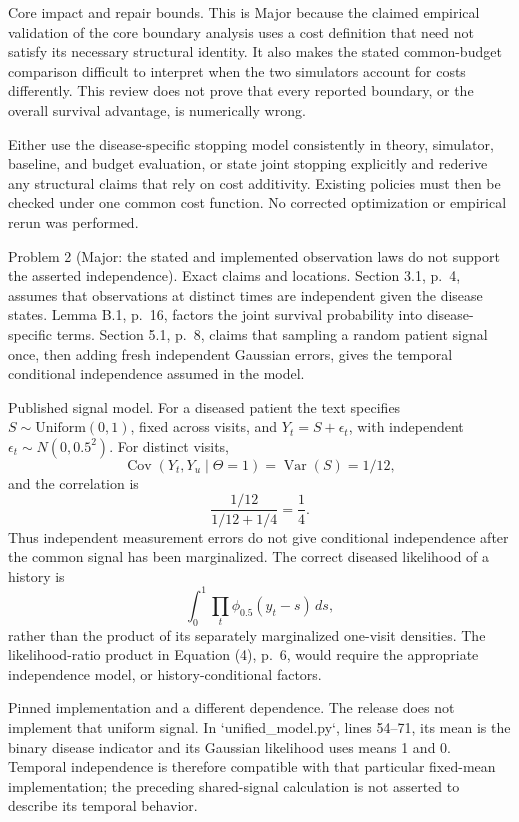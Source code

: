 \documentclass[10pt]{article}
\begin{document}
Core impact and repair bounds. This is Major because the claimed empirical validation of the core boundary analysis uses a cost definition that need not satisfy its necessary structural identity. It also makes the stated common-budget comparison difficult to interpret when the two simulators account for costs differently. This review does not prove that every reported boundary, or the overall survival advantage, is numerically wrong.\par
Either use the disease-specific stopping model consistently in theory, simulator, baseline, and budget evaluation, or state joint stopping explicitly and rederive any structural claims that rely on cost additivity. Existing policies must then be checked under one common cost function. No corrected optimization or empirical rerun was performed.\par
Problem 2 (Major: the stated and implemented observation laws do not support the asserted independence).  Exact claims and locations. Section 3.1, p. 4, assumes that observations at distinct times are independent given the disease states. Lemma B.1, p. 16, factors the joint survival probability into disease-specific terms. Section 5.1, p. 8, claims that sampling a random patient signal once, then adding fresh independent Gaussian errors, gives the temporal conditional independence assumed in the model.\par
Published signal model. For a diseased patient the text specifies \(S\sim\mathrm{Uniform}(0,1)\), fixed across visits, and \(Y_t=S+\epsilon_t\), with independent \(\epsilon_t\sim N(0,0.5^2)\). For distinct visits, \[\operatorname{Cov}(Y_t,Y_u\mid\Theta=1)=\operatorname{Var}(S)=1/12,\] and the correlation is \[\frac{1/12}{1/12+1/4}=\frac14.\] Thus independent measurement errors do not give conditional independence after the common signal has been marginalized. The correct diseased likelihood of a history is \[\int_0^1\prod_t\phi_{0.5}(y_t-s)\,ds,\] rather than the product of its separately marginalized one-visit densities. The likelihood-ratio product in Equation (4), p. 6, would require the appropriate independence model, or history-conditional factors.\par
Pinned implementation and a different dependence. The release does not implement that uniform signal. In `unified\_model.py`, lines 54–71, its mean is the binary disease indicator and its Gaussian likelihood uses means 1 and 0. Temporal independence is therefore compatible with that particular fixed-mean implementation; the preceding shared-signal calculation is not asserted to describe its temporal behavior.\par
\end{document}
